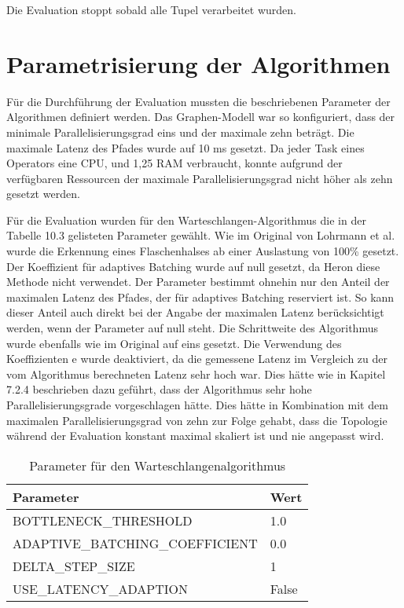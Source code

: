 Die Evaluation stoppt sobald alle Tupel verarbeitet wurden.

\section{Parametrisierung der Algorithmen}

Für die Durchführung der Evaluation mussten die beschriebenen Parameter der Algorithmen definiert werden.
Das Graphen-Modell war so konfiguriert, dass der minimale Parallelisierungsgrad eins und der maximale zehn beträgt.
Die maximale Latenz des Pfades wurde auf 10 ms gesetzt.
Da jeder Task eines Operators eine CPU, und 1,25 RAM verbraucht, konnte aufgrund der verfügbaren Ressourcen der maximale Parallelisierungsgrad nicht höher als zehn gesetzt werden.

Für die Evaluation wurden für den Warteschlangen-Algorithmus die in der Tabelle 10.3 gelisteten Parameter gewählt.
Wie im Original von Lohrmann et al. wurde die Erkennung eines Flaschenhalses ab einer Auslastung von 100\% gesetzt.
Der Koeffizient für adaptives Batching wurde auf null gesetzt, da Heron diese Methode nicht verwendet.
Der Parameter bestimmt ohnehin nur den Anteil der maximalen Latenz des Pfades, der für adaptives Batching reserviert ist.
So kann dieser Anteil auch direkt bei der Angabe der maximalen Latenz berücksichtigt werden, wenn der Parameter auf null steht.
Die Schrittweite des Algorithmus wurde ebenfalls wie im Original auf eins gesetzt.
Die Verwendung des Koeffizienten e wurde deaktiviert, da die gemessene Latenz im Vergleich zu der vom Algorithmus berechneten Latenz sehr hoch war.
Dies hätte wie in Kapitel 7.2.4 beschrieben dazu geführt, dass der Algorithmus sehr hohe Parallelisierungsgrade vorgeschlagen hätte.
Dies hätte in Kombination mit dem maximalen Parallelisierungsgrad von zehn zur Folge gehabt, dass die Topologie während der Evaluation konstant maximal skaliert ist und nie angepasst wird.

\begin{table}
\caption{Parameter für den Warteschlangenalgorithmus}
\centering
\begin{tabular}{ll}
\hline
\textbf{Parameter} & \textbf{Wert} \\ \hline
BOTTLENECK\_THRESHOLD & 1.0 \\
ADAPTIVE\_BATCHING\_COEFFICIENT & 0.0 \\
DELTA\_STEP\_SIZE & 1 \\
USE\_LATENCY\_ADAPTION & False\\
\hline
\end{tabular}
\end{table}

